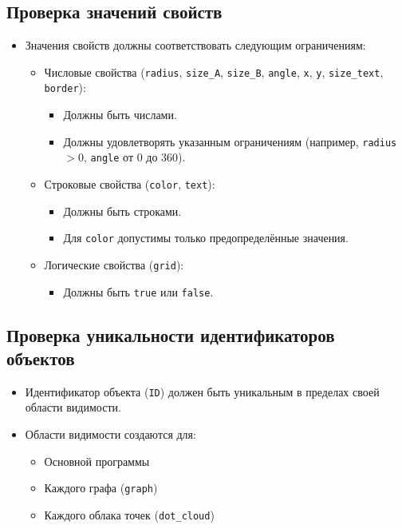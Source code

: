 \documentclass{article}
\begin{document}
\subsection{Проверка значений свойств}
\begin{itemize}
    \item Значения свойств должны соответствовать следующим ограничениям:
    \begin{itemize}
        \item Числовые свойства (\texttt{radius}, \texttt{size\_A}, \texttt{size\_B}, \texttt{angle}, \texttt{x}, \texttt{y}, \texttt{size\_text}, \texttt{border}):
        \begin{itemize}
            \item Должны быть числами.
            \item Должны удовлетворять указанным ограничениям (например, \texttt{radius} $> 0$, \texttt{angle} от 0 до 360).
        \end{itemize}
        \item Строковые свойства (\texttt{color}, \texttt{text}):
        \begin{itemize}
            \item Должны быть строками.
            \item Для \texttt{color} допустимы только предопределённые значения.
        \end{itemize}
        \item Логические свойства (\texttt{grid}):
        \begin{itemize}
            \item Должны быть \texttt{true} или \texttt{false}.
        \end{itemize}
    \end{itemize}
\end{itemize}

\subsection{Проверка уникальности идентификаторов объектов}
\begin{itemize}
    \item Идентификатор объекта (\texttt{ID}) должен быть уникальным в пределах своей области видимости.
    \item Области видимости создаются для:
    \begin{itemize}
        \item Основной программы
        \item Каждого графа (\texttt{graph})
        \item Каждого облака точек (\texttt{dot\_cloud})
    \end{itemize}
\end{itemize}
\end{document}
